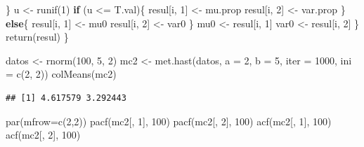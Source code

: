 \documentclass[
  10pt,
  spanish,
]{book}
\newenvironment{Shaded}{\begin{snugshade}}{\end{snugshade}}
\newcommand{\AttributeTok}[1]{\textcolor[rgb]{0.77,0.63,0.00}{#1}}
\newcommand{\ControlFlowTok}[1]{\textcolor[rgb]{0.13,0.29,0.53}{\textbf{#1}}}
\newcommand{\DecValTok}[1]{\textcolor[rgb]{0.00,0.00,0.81}{#1}}
\newcommand{\FunctionTok}[1]{\textcolor[rgb]{0.00,0.00,0.00}{#1}}
\newcommand{\NormalTok}[1]{#1}
\newcommand{\OtherTok}[1]{\textcolor[rgb]{0.56,0.35,0.01}{#1}}
\newcommand{\SpecialCharTok}[1]{\textcolor[rgb]{0.00,0.00,0.00}{#1}}
\theoremstyle{definition}
\theoremstyle{definition}
\theoremstyle{definition}
\theoremstyle{definition}
\theoremstyle{remark}
\begin{document}
\begin{Shaded}
\begin{Highlighting}[]
\NormalTok{    \}}
\NormalTok{    u }\OtherTok{\textless{}{-}} \FunctionTok{runif}\NormalTok{(}\DecValTok{1}\NormalTok{) }
    \ControlFlowTok{if}\NormalTok{ (u }\SpecialCharTok{\textless{}=}\NormalTok{ T.val)\{}
\NormalTok{      resul[i, }\DecValTok{1}\NormalTok{] }\OtherTok{\textless{}{-}}\NormalTok{ mu.prop}
\NormalTok{      resul[i, }\DecValTok{2}\NormalTok{] }\OtherTok{\textless{}{-}}\NormalTok{ var.prop}
\NormalTok{      \} }
    \ControlFlowTok{else}\NormalTok{\{}
\NormalTok{      resul[i, }\DecValTok{1}\NormalTok{] }\OtherTok{\textless{}{-}}\NormalTok{ mu0}
\NormalTok{      resul[i, }\DecValTok{2}\NormalTok{] }\OtherTok{\textless{}{-}}\NormalTok{ var0}
\NormalTok{      \}}
\NormalTok{    mu0 }\OtherTok{\textless{}{-}}\NormalTok{ resul[i, }\DecValTok{1}\NormalTok{]}
\NormalTok{    var0 }\OtherTok{\textless{}{-}}\NormalTok{ resul[i, }\DecValTok{2}\NormalTok{]}
\NormalTok{  \}}
  \FunctionTok{return}\NormalTok{(resul)}
\NormalTok{\}}

\NormalTok{datos }\OtherTok{\textless{}{-}} \FunctionTok{rnorm}\NormalTok{(}\DecValTok{100}\NormalTok{, }\DecValTok{5}\NormalTok{, }\DecValTok{2}\NormalTok{)}
\NormalTok{mc2 }\OtherTok{\textless{}{-}} \FunctionTok{met.hast}\NormalTok{(datos, }\AttributeTok{a =} \DecValTok{2}\NormalTok{, }\AttributeTok{b =} \DecValTok{5}\NormalTok{, }
                \AttributeTok{iter =} \DecValTok{1000}\NormalTok{, }\AttributeTok{ini =} \FunctionTok{c}\NormalTok{(}\DecValTok{2}\NormalTok{, }\DecValTok{2}\NormalTok{))}
\FunctionTok{colMeans}\NormalTok{(mc2)}
\end{Highlighting}
\end{Shaded}

\begin{verbatim}
## [1] 4.617579 3.292443
\end{verbatim}

\begin{Shaded}
\begin{Highlighting}[]
\FunctionTok{par}\NormalTok{(}\AttributeTok{mfrow=}\FunctionTok{c}\NormalTok{(}\DecValTok{2}\NormalTok{,}\DecValTok{2}\NormalTok{))}
\FunctionTok{pacf}\NormalTok{(mc2[, }\DecValTok{1}\NormalTok{], }\DecValTok{100}\NormalTok{)}
\FunctionTok{pacf}\NormalTok{(mc2[, }\DecValTok{2}\NormalTok{], }\DecValTok{100}\NormalTok{)}
\FunctionTok{acf}\NormalTok{(mc2[, }\DecValTok{1}\NormalTok{], }\DecValTok{100}\NormalTok{)}
\FunctionTok{acf}\NormalTok{(mc2[, }\DecValTok{2}\NormalTok{], }\DecValTok{100}\NormalTok{)}
\end{Highlighting}
\end{Shaded}
\end{document}
